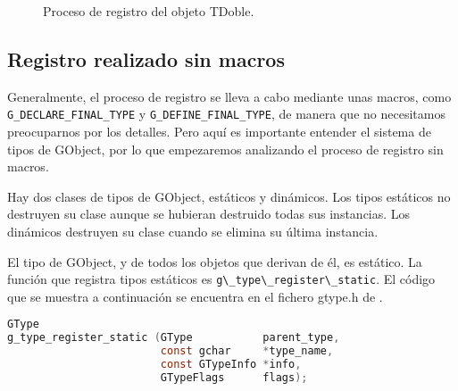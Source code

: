 \begin{figure}[ht]
\caption{Proceso de registro del objeto \textsf{TDoble}.}
\label{fig:proceso-registro}
\end{figure}

\subsection{Registro realizado sin macros}
Generalmente, el proceso de registro se lleva a cabo mediante unas macros, como
\texttt{G\_DECLARE\_FINAL\_TYPE} y \texttt{G\_DEFINE\_FINAL\_TYPE}, de manera que no
necesitamos preocuparnos por los detalles. Pero aquí es importante entender el
sistema de tipos de \textsf{GObject}, por lo que empezaremos analizando el proceso
de registro sin macros.

Hay dos clases de tipos de \textsf{GObject}, estáticos y dinámicos. Los tipos estáticos
no destruyen su clase aunque se hubieran destruido todas sus instancias. Los dinámicos
destruyen su clase cuando se elimina su última instancia.

El tipo de \textsf{GObject}, y de todos los objetos que derivan de él, es estático.
La función que registra tipos estáticos es
\passthrough{\lstinline!g\_type\_register\_static!}.
El código que se muestra a continuación se encuentra en el fichero \textsf{gtype.h} de
.

\begin{lstlisting}[language=C]
GType
g_type_register_static (GType           parent_type,
                        const gchar     *type_name,
                        const GTypeInfo *info,
                        GTypeFlags      flags);
\end{lstlisting}

